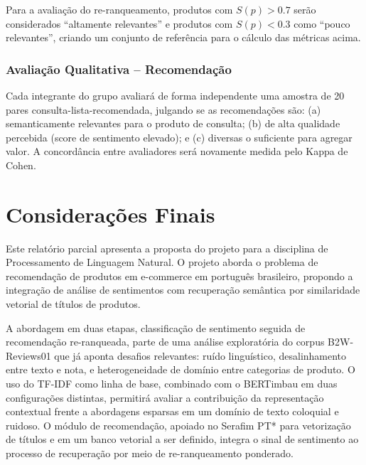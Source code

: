 \documentclass{IEEEtran}
\begin{document}
Para a avaliação do re-ranqueamento, produtos com $S(p) > 0.7$ serão considerados ``altamente relevantes'' e produtos com $S(p) < 0.3$ como ``pouco relevantes'', criando um conjunto de referência para o cálculo das métricas acima.

\subsubsection{Avaliação Qualitativa -- Recomendação}
\label{subsubsec:qual_recommendation}

Cada integrante do grupo avaliará de forma independente uma amostra de 20 pares consulta-lista-recomendada, julgando se as recomendações são: (a) semanticamente relevantes para o produto de consulta; (b) de alta qualidade percebida (score de sentimento elevado); e (c) diversas o suficiente para agregar valor. A concordância entre avaliadores será novamente medida pelo Kappa de Cohen.

\section{Considerações Finais}
\label{sec:conclusion}

Este relatório parcial apresenta a proposta do projeto para a disciplina de Processamento de Linguagem Natural. O projeto aborda o problema de recomendação de produtos em e-commerce em português brasileiro, propondo a integração de análise de sentimentos com recuperação semântica por similaridade vetorial de títulos de produtos.

A abordagem em duas etapas, classificação de sentimento seguida de recomendação re-ranqueada, parte de uma análise exploratória do corpus B2W-Reviews01 que já aponta desafios relevantes: ruído linguístico, desalinhamento entre texto e nota, e heterogeneidade de domínio entre categorias de produto. O uso do TF-IDF como linha de base, combinado com o BERTimbau em duas configurações distintas, permitirá avaliar a contribuição da representação contextual frente a abordagens esparsas em um domínio de texto coloquial e ruidoso. O módulo de recomendação, apoiado no Serafim PT* para vetorização de títulos e em um banco vetorial a ser definido, integra o sinal de sentimento ao processo de recuperação por meio de re-ranqueamento ponderado.
\end{document}
